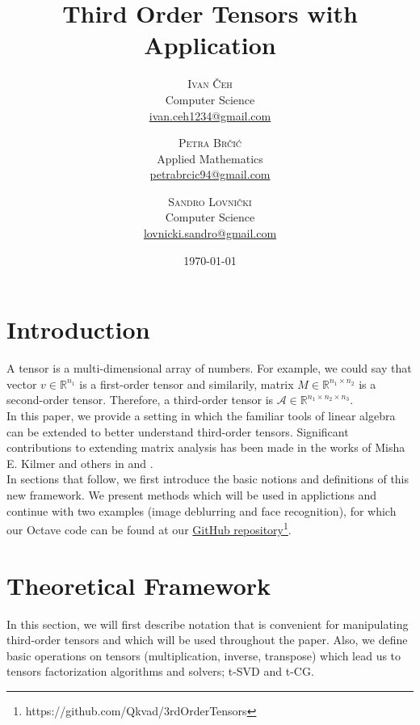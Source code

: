 \documentclass[twoside]{article}
\title{Third Order Tensors with Application} %
\author{%
\textsc{Ivan \v{C}eh}\\%
\normalsize Computer Science \\
\normalsize \href{mailto:ivan.ceh1234@gmail.com}{ivan.ceh1234@gmail.com} 
\and
\textsc{Petra Br\v{c}i\'c}\\%
\normalsize Applied Mathematics \\
\normalsize \href{mailto:petrabrcic94@gmail.com}{petrabrcic94@gmail.com} 
\and
\textsc{Sandro Lovni\v{c}ki}\\%
\normalsize Computer Science \\ 
\normalsize \href{mailto:lovnicki.sandro@gmail.com}{lovnicki.sandro@gmail.com}
}
\date{\today}
\begin{document}
\maketitle

\begin{multicols}{2}

\section{Introduction}
A tensor is a multi-dimensional array of numbers. For example, we could say that vector $v \in \mathbb{R}^{n_1}$ is a first-order tensor and similarily, matrix $M \in \mathbb{R}^{n_1 \times n_2}$ is a second-order tensor. Therefore, a third-order tensor is $\mathcal{A} \in \mathbb{R}^{n_1 \times n_2 \times n_3}$.\\
\indent In this paper, we provide a setting in which the familiar tools of linear algebra can be extended to better understand third-order tensors. Significant contributions to extending matrix analysis has been made in the works of Misha E. Kilmer and others in \cite{kilmer-braman-hao} and \cite{kilmer-martin}.\\
\indent In sections that follow, we first introduce the basic notions and definitions of this new framework. We present methods which will be used in applictions and continue with two examples (image deblurring and face recognition), for which our Octave code can be found at our \hyperref[https://github.com/Qkvad/3rdOrderTensors]{GitHub repository}\footnote{https://github.com/Qkvad/3rdOrderTensors}.

\section{Theoretical Framework}
In this section, we will first describe notation that is convenient for manipulating third-order tensors and which will be used throughout the paper. Also, we define basic operations on tensors (multiplication, inverse, transpose) which lead us to tensors factorization algorithms and solvers; t-SVD and t-CG.


\end{multicols}
\end{document}
